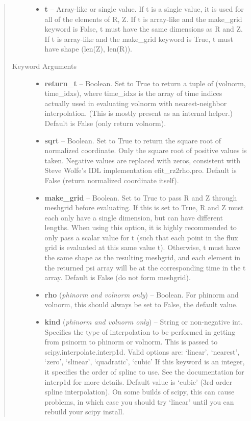 \documentclass[letterpaper,10pt,english]{sphinxmanual}
\begin{document}
\begin{fulllineitems}
\begin{fulllineitems}
\begin{quote}
\begin{description}
\begin{itemize}
\item {} 
\textbf{t} --
Array-like or single value. If t is a single value, it is used
for all of the elements of R, Z. If t is array-like and the
make\_grid keyword is False, t must have the same dimensions as
R and Z. If t is array-like and the make\_grid keyword is True,
t must have shape (len(Z), len(R)).

\end{itemize}

\item[{Keyword Arguments}] \leavevmode\begin{itemize}
\item {} 
\textbf{return\_t} --
Boolean. Set to True to return a tuple of (volnorm,
time\_idxs), where time\_idxs is the array of time indices
actually used in evaluating volnorm with nearest-neighbor
interpolation. (This is mostly present as an internal helper.)
Default is False (only return volnorm).

\item {} 
\textbf{sqrt} --
Boolean. Set to True to return the square root of normalized
coordinate. Only the square root of positive values is taken.
Negative values are replaced with zeros, consistent with Steve
Wolfe's IDL implementation efit\_rz2rho.pro. Default is False
(return normalized coordinate itself).

\item {} 
\textbf{make\_grid} --
Boolean. Set to True to pass R and Z through meshgrid
before evaluating. If this is set to True, R and Z must each
only have a single dimension, but can have different lengths.
When using this option, it is highly recommended to only pass
a scalar value for t (such that each point in the flux grid is
evaluated at this same value t). Otherwise, t must have the
same shape as the resulting meshgrid, and each element in the
returned psi array will be at the corresponding time in the t
array. Default is False (do not form meshgrid).

\item {} 
\textbf{rho} (\emph{phinorm and volnorm only}) --
Boolean. For phinorm and volnorm,
this should always be set to False, the default value.

\item {} 
\textbf{kind} (\emph{phinorm and volnorm only}) --
String or non-negative int.
Specifies the type of interpolation to be performed in getting
from psinorm to phinorm or volnorm. This is passed to
scipy.interpolate.interp1d. Valid options are:
`linear', `nearest', `zero', `slinear', `quadratic', `cubic'
If this keyword is an integer, it specifies the order of spline
to use. See the documentation for interp1d for more details.
Default value is `cubic' (3rd order spline interpolation). On
some builds of scipy, this can cause problems, in which case
you should try `linear' until you can rebuild your scipy install.


\end{itemize}
\end{description}
\end{quote}
\end{fulllineitems}
\end{fulllineitems}
\end{document}
